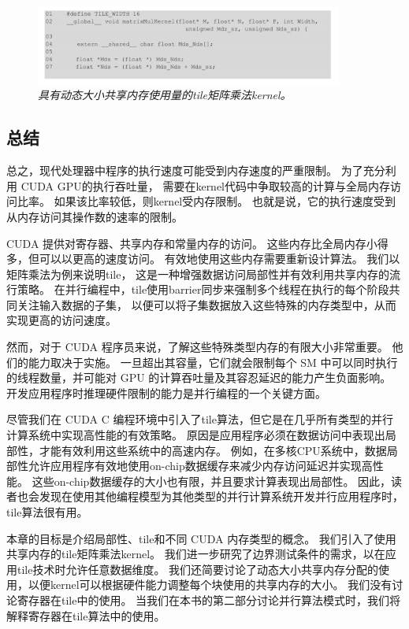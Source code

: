 \begin{figure}[H]
	\centering
	\includegraphics[width=0.9\textwidth]{figs/F5.14.png}
	\caption{\textit{具有动态大小共享内存使用量的tile矩阵乘法kernel。}}
\end{figure}

\subsection{总结}
总之，现代处理器中程序的执行速度可能受到内存速度的严重限制。 为了充分利用 CUDA GPU的执行吞吐量，
需要在kernel代码中争取较高的计算与全局内存访问比率。 如果该比率较低，则kernel受内存限制。 
也就是说，它的执行速度受到从内存访问其操作数的速率的限制。

CUDA 提供对寄存器、共享内存和常量内存的访问。 这些内存比全局内存小得多，但可以以更高的速度访问。 
有效地使用这些内存需要重新设计算法。 我们以矩阵乘法为例来说明tile，
这是一种增强数据访问局部性并有效利用共享内存的流行策略。 
在并行编程中，tile使用barrier同步来强制多个线程在执行的每个阶段共同关注输入数据的子集，
以便可以将子集数据放入这些特殊的内存类型中，从而实现更高的访问速度。

然而，对于 CUDA 程序员来说，了解这些特殊类型内存的有限大小非常重要。 他们的能力取决于实施。 
一旦超出其容量，它们就会限制每个 SM 中可以同时执行的线程数量，并可能对 GPU 的计算吞吐量及其容忍延迟的能力产生负面影响。 
开发应用程序时推理硬件限制的能力是并行编程的一个关键方面。

尽管我们在 CUDA C 编程环境中引入了tile算法，但它是在几乎所有类型的并行计算系统中实现高性能的有效策略。 
原因是应用程序必须在数据访问中表现出局部性，才能有效利用这些系统中的高速内存。 
例如，在多核CPU系统中，数据局部性允许应用程序有效地使用on-chip数据缓存来减少内存访问延迟并实现高性能。 
这些on-chip数据缓存的大小也有限，并且要求计算表现出局部性。 
因此，读者也会发现在使用其他编程模型为其他类型的并行计算系统开发并行应用程序时，tile算法很有用。

本章的目标是介绍局部性、tile和不同 CUDA 内存类型的概念。 我们引入了使用共享内存的tile矩阵乘法kernel。 
我们进一步研究了边界测试条件的需求，以在应用tile技术时允许任意数据维度。 
我们还简要讨论了动态大小共享内存分配的使用，以便kernel可以根据硬件能力调整每个块使用的共享内存的大小。 
我们没有讨论寄存器在tile中的使用。 当我们在本书的第二部分讨论并行算法模式时，我们将解释寄存器在tile算法中的使用。
